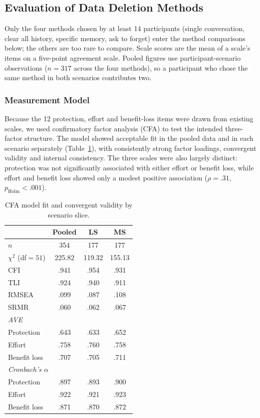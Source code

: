 \documentclass[conference,compsoc]{IEEEtran}
\begin{document}
\subsection{Evaluation of Data Deletion Methods}

Only the four methods chosen by at least 14 participants (single conversation, clear all history, specific memory, ask to forget) enter the method comparisons below; the others are too rare to compare. Scale scores are the mean of a scale's items on a five-point agreement scale. Pooled figures use participant-scenario observations ($n=317$ across the four methods), so a participant who chose the same method in both scenarios contributes two.

\subsubsection{Measurement Model}

Because the 12 protection, effort and benefit-loss items were drawn from existing scales, we used confirmatory factor analysis (CFA) to test the intended three-factor structure. The model showed acceptable fit in the pooled data and in each scenario separately (Table~\ref{tab:cfa-fit}), with consistently strong factor loadings, convergent validity and internal consistency. The three scales were also largely distinct: protection was not significantly associated with either effort or benefit loss, while effort and benefit loss showed only a modest positive association ($\rho=.31$, $p_{\mathrm{Holm}}<.001$).

\begin{table}[t]
\centering
\caption{CFA model fit and convergent validity by scenario slice.}
\label{tab:cfa-fit}
\small
\setlength{\tabcolsep}{4pt}
\begin{tabular}{lccc}
\toprule
 & Pooled & LS & MS \\
\midrule
$n$ & 354 & 177 & 177 \\
$\chi^2$ (df${}=51$) & 225.82 & 119.32 & 155.13 \\
CFI & .941 & .954 & .931 \\
TLI & .924 & .940 & .911 \\
RMSEA & .099 & .087 & .108 \\
SRMR & .060 & .062 & .067 \\
\midrule
\multicolumn{4}{l}{\textit{AVE}} \\
\quad Protection & .643 & .633 & .652 \\
\quad Effort & .758 & .760 & .758 \\
\quad Benefit loss & .707 & .705 & .711 \\
\midrule
\multicolumn{4}{l}{\textit{Cronbach's $\alpha$}} \\
\quad Protection & .897 & .893 & .900 \\
\quad Effort & .922 & .921 & .923 \\
\quad Benefit loss & .871 & .870 & .872 \\
\bottomrule
\end{tabular}
\end{table}
\end{document}
